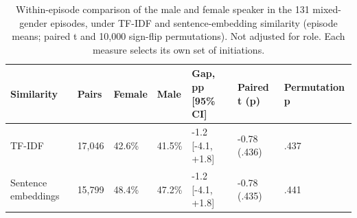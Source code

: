 \begin{table}[htbp]
\centering
\small
\caption{Within-episode comparison of the male and female speaker in the 131 mixed-gender episodes, under TF-IDF and sentence-embedding similarity (episode means; paired t and 10,000 sign-flip permutations). Not adjusted for role. Each measure selects its own set of initiations.}
\label{tab:table13_corrected}
\begin{tabular}{lllllll}
\toprule
Similarity & Pairs & Female & Male & Gap, pp [95\% CI] & Paired t (p) & Permutation p \\
\midrule
TF-IDF & 17,046 & 42.6\% & 41.5\% & -1.2 [-4.1, +1.8] & -0.78 (.436) & .437 \\
Sentence embeddings & 15,799 & 48.4\% & 47.2\% & -1.2 [-4.1, +1.8] & -0.78 (.435) & .441 \\
\bottomrule
\end{tabular}
\end{table}
